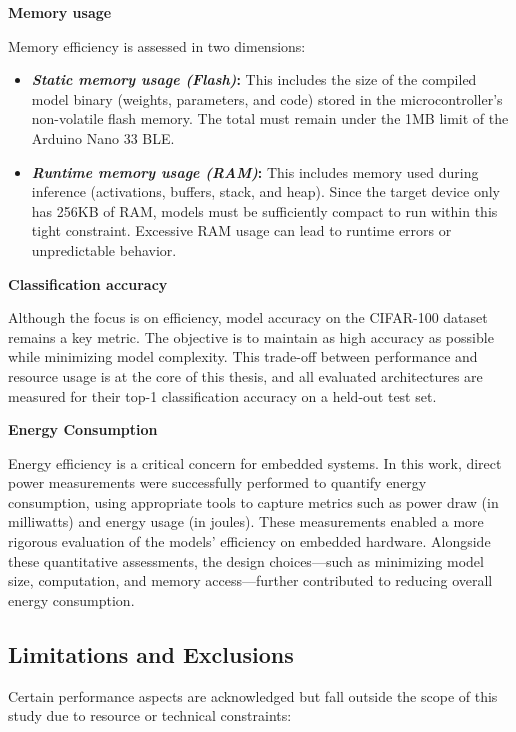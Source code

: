 \textbf{Memory usage}

Memory efficiency is assessed in two dimensions:
\begin{itemize}
    \item \textbf{\textit{Static memory usage (Flash)}:} This includes the size of the compiled model binary (weights, parameters, and code) stored in the microcontroller's non-volatile flash memory. The total must remain under the 1MB limit of the Arduino Nano 33 BLE.

    \item \textbf{\textit{Runtime memory usage (RAM)}:} This includes memory used during inference (activations, buffers, stack, and heap). Since the target device only has 256KB of RAM, models must be sufficiently compact to run within this tight constraint. Excessive RAM usage can lead to runtime errors or unpredictable behavior.
\end{itemize}

\textbf{Classification accuracy}

Although the focus is on efficiency, model accuracy on the CIFAR-100 dataset remains a key metric. The objective is to maintain as high accuracy as possible while minimizing model complexity. This trade-off between performance and resource usage is at the core of this thesis, and all evaluated architectures are measured for their top-1 classification accuracy on a held-out test set.

\textbf{Energy Consumption}

Energy efficiency is a critical concern for embedded systems. In this work, direct power measurements were successfully performed to quantify energy consumption, using appropriate tools to capture metrics such as power draw (in milliwatts) and energy usage (in joules). These measurements enabled a more rigorous evaluation of the models' efficiency on embedded hardware. Alongside these quantitative assessments, the design choices—such as minimizing model size, computation, and memory access—further contributed to reducing overall energy consumption.

\clearpage

\subsection{\textbf{Limitations and Exclusions}}

Certain performance aspects are acknowledged but fall outside the scope of this study due to resource or technical constraints:

